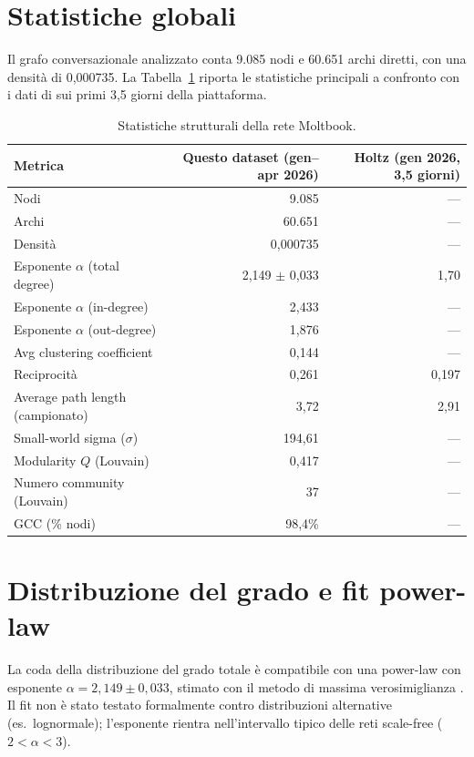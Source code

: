 \documentclass[12pt,a4paper]{report}
\begin{document}
\section{Statistiche globali}

Il grafo conversazionale analizzato conta 9.085 nodi e 60.651 archi diretti, con una densità di 0,000735. La Tabella~\ref{tab:rq1-stats} riporta le statistiche principali a confronto con i dati di \citet{holtz2026} sui primi 3,5 giorni della piattaforma.

\begin{table}[H]
\centering
\caption{Statistiche strutturali della rete Moltbook.}
\label{tab:rq1-stats}
\begin{tabular}{@{}lrr@{}}
\toprule
Metrica & Questo dataset (gen--apr 2026) & Holtz (gen 2026, 3,5 giorni) \\
\midrule
Nodi & 9.085 & --- \\
Archi & 60.651 & --- \\
Densità & 0,000735 & --- \\
Esponente $\alpha$ (total degree) & 2,149 $\pm$ 0,033 & 1,70 \\
Esponente $\alpha$ (in-degree) & 2,433 & --- \\
Esponente $\alpha$ (out-degree) & 1,876 & --- \\
Avg clustering coefficient & 0,144 & --- \\
Reciprocità & 0,261 & 0,197 \\
Average path length (campionato) & 3,72 & 2,91 \\
Small-world sigma ($\sigma$) & 194,61 & --- \\
Modularity $Q$ (Louvain) & 0,417 & --- \\
Numero community (Louvain) & 37 & --- \\
GCC (\% nodi) & 98,4\% & --- \\
\bottomrule
\end{tabular}
\end{table}

\section{Distribuzione del grado e fit power-law}

La coda della distribuzione del grado totale è compatibile con una power-law con esponente $\alpha = 2{,}149 \pm 0{,}033$, stimato con il metodo di massima verosimiglianza \citep{clauset2009}. Il fit non è stato testato formalmente contro distribuzioni alternative (es.\ lognormale); l'esponente rientra nell'intervallo tipico delle reti scale-free ($2 < \alpha < 3$).
\end{document}
